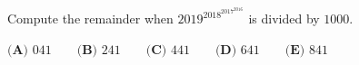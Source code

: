 Compute the remainder when $2019^{2018^{2017^{2016}}}$ is divided by $1000$.

$\textbf{(A) } 041 \qquad\textbf{(B) } 241 \qquad\textbf{(C) } 441 \qquad\textbf{(D) } 641 \qquad\textbf{(E) } 841$
